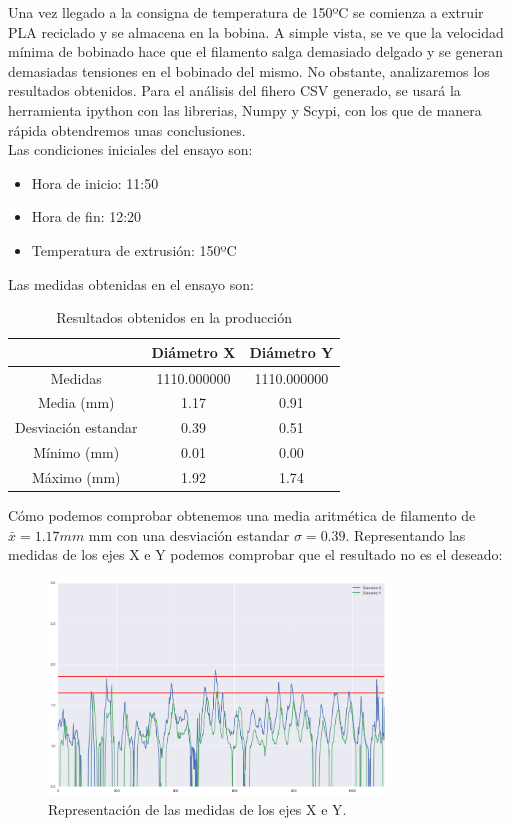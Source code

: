Una vez llegado a la consigna de temperatura de 150ºC se comienza a extruir PLA reciclado y se almacena en la bobina. A simple vista, se ve que la velocidad mínima de bobinado hace que el filamento salga demasiado delgado y se generan demasiadas tensiones en el bobinado del mismo. No obstante, analizaremos los resultados obtenidos. Para el análisis del fihero CSV generado, se usará la herramienta ipython con las librerias, Numpy y Scypi, con los que de manera rápida obtendremos unas conclusiones.\\

Las condiciones iniciales del ensayo son:

	\begin{itemize}
		\item Hora de inicio: 11:50
		\item Hora de fin: 12:20
		\item Temperatura de extrusión: 150ºC
	\end{itemize}

Las medidas obtenidas en el ensayo son:

\begin{table}[H]
	\centering
	\begin{tabular}{ccc}
		{\bf } & {\bf Diámetro X} & {\bf Diámetro Y} \\ \hline
		Medidas & 1110.000000 & 1110.000000 \\
		Media (mm) & 1.17 & 0.91 \\
		Desviación estandar & 0.39 & 0.51 \\
		Mínimo (mm) & 0.01 & 0.00 \\
		Máximo (mm) & 1.92 & 1.74
	\end{tabular}
	\caption{Resultados obtenidos en la producción}
	\label{tab:result1}
\end{table}

Cómo podemos comprobar obtenemos una media aritmética de filamento de $ \bar{x} = 1.17mm $  mm con una desviación estandar  $\sigma = 0.39$. Representando las medidas de los ejes X e Y podemos comprobar que el resultado no es el deseado:

\begin{figure}[H]
	\centering
	\includegraphics[width=0.8\textwidth]{images/producciones/16062015/output_9_1.png}
	\caption{Representación de las medidas de los ejes X e Y.}
	\label{fig:prod_ejes}
\end{figure}


